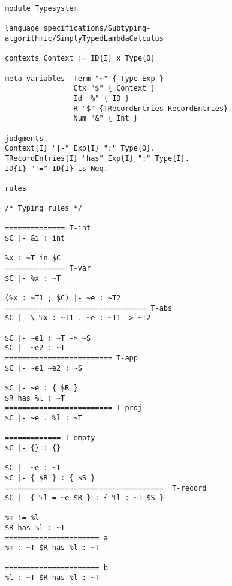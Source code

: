 \begin{lstlisting}[language=sltc]
module Typesystem

language specifications/Subtyping-algorithmic/SimplyTypedLambdaCalculus

contexts Context := ID{I} x Type{O}

meta-variables  Term "~" { Type Exp }
                Ctx "$" { Context }
                Id "%" { ID }
                R "$" {TRecordEntries RecordEntries}
                Num "&" { Int }

judgments
Context{I} "|-" Exp{I} ":" Type{O}.
TRecordEntries{I} "has" Exp{I} ":" Type{I}.
ID{I} "!=" ID{I} is Neq.

rules

/* Typing rules */

============== T-int
$C |- &i : int

%x : ~T in $C
============== T-var
$C |- %x : ~T

(%x : ~T1 ; $C) |- ~e : ~T2
================================= T-abs
$C |- \ %x : ~T1 . ~e : ~T1 -> ~T2

$C |- ~e1 : ~T -> ~S
$C |- ~e2 : ~T
========================= T-app
$C |- ~e1 ~e2 : ~S

$C |- ~e : { $R }
$R has %l : ~T
========================= T-proj
$C |- ~e . %l : ~T

============= T-empty
$C |- {} : {}

$C |- ~e : ~T
$C |- { $R } : { $S }
=====================================  T-record
$C |- { %l = ~e $R } : { %l : ~T $S }

%m != %l
$R has %l : ~T
====================== a
%m : ~T $R has %l : ~T 

====================== b
%l : ~T $R has %l : ~T
\end{lstlisting}
\newpage
